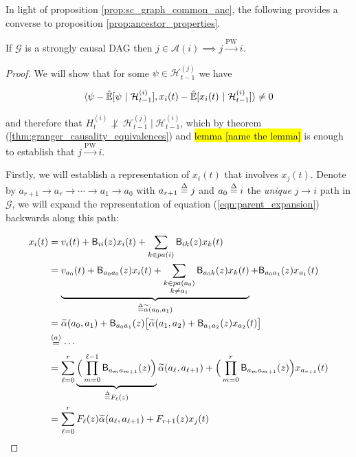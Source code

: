 \documentclass[12pt]{article}
\def\pwgc{\overset{\text{PW}}{\rightarrow}}  %
\def\gcg{\mathcal{G}}  %
\def\B{\mathsf{B}}  %
\def\H{\mathcal{H}}  %
\newcommand{\linE}[2]{\hat{\E}[#1\ |\ #2]}  %
\newcommand{\pa}[1]{pa(#1)}  %
\newcommand{\anc}[1]{\mathcal{A}(#1)}  %
\newcommand{\wtalpha}[2]{\widetilde{\alpha}(#1, #2)}  %
\begin{document}
In light of proposition \ref{prop:sc_graph_common_anc}, the following
provides a converse to proposition \ref{prop:ancestor_properties}.

\begin{proposition}
  \label{prop:pwgc_anc}
  If $\gcg$ is a strongly causal DAG then $j \in \anc{i} \implies j \pwgc i$.
\end{proposition}
\begin{proof}
  We will show that for some $\psi \in \H_{t - 1}^{(j)}$ we have

  \begin{equation}
    \label{eqn:cond_ortho_proof}
    \inner{\psi - \linE{\psi}{\H_{t - 1}^{(i)}}}{x_i(t) - \linE{x_i(t)}{\H_{t - 1}^{(i)}}} \ne 0
  \end{equation}

  and therefore that $H_t^{(i)} \not\perp\ \H_{t - 1}^{(j)}\ |\ \H_{t - 1}^{(i)}$, which by theorem (\ref{thm:granger_causality_equivalences}) and \hl{lemma [name the lemma]} is enough to establish that $j \pwgc i$.

  Firstly, we will establish a representation of $x_i(t)$ that involves $x_j(t)$.  Denote by $a_{r + 1} \rightarrow a_r \rightarrow \cdots \rightarrow a_1 \rightarrow a_0$ with $a_{r + 1} \overset{\Delta}{=} j$ and $a_0 \overset{\Delta}{=} i$ the \textit{unique} $j \rightarrow i$ path in $\gcg$, we will expand the representation of equation (\ref{eqn:parent_expansion}) backwards along this path:

  \begin{align*}
    x_i(t) &= v_i(t) + \B_{ii}(z) x_i(t) + \sum_{k \in \pa{i}}\B_{ik}(z) x_k(t)\\
           &= \underbrace{v_{a_0}(t) + \B_{a_0a_0}(z) x_i(t) + \sum_{\substack{k \in \pa{a_0} \\ k \ne a_1}}\B_{a_0 k}(z) x_k(t)}_{\defeq \wtalpha{a_0}{a_1}} + \B_{a_0a_1}(z)x_{a_1}(t)\\
           &= \wtalpha{a_0}{a_1} + \B_{a_0a_1}(z)\big[\wtalpha{a_1}{a_2} + \B_{a_1a_2}(z)x_{a_2}(t) \big]\\
           &\overset{(a)}{=} \cdots\\
           &= \sum_{\ell = 0}^r \underbrace{\Big(\prod_{m = 0}^{\ell - 1} \B_{a_m a_{m + 1}}(z) \Big)}_{\defeq F_\ell(z)} \wtalpha{a_\ell}{a_{\ell + 1}} + \Big(\prod_{m = 0}^{r}\B_{a_m a_{m + 1}}(z)\Big)x_{a_{r + 1}}(t)\\
           &= \sum_{\ell = 0}^r F_\ell(z) \wtalpha{a_\ell}{a_{\ell + 1}} + F_{r + 1}(z) x_j(t)
  \end{align*}


\end{proof}
\end{document}
